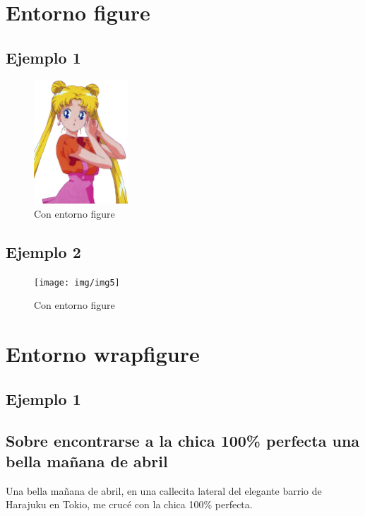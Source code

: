 \documentclass[letterpaper]{article}
\begin{document}
	\newpage
	\section{Entorno figure}
	\subsection{Ejemplo 1}
	
	\begin{figure}[h]
		\centering
		\caption{Con entorno figure}
		\includegraphics[width=100pt]{img/img3_2}
	\end{figure}
	
	\subsection{Ejemplo 2}	
	\begin{figure}[h]
		\centering
		\texttt{[image: img/img5]}
		\caption{Con entorno figure}
	\end{figure}
	
	\newpage
	\section{Entorno wrapfigure}
	
	\subsection{Ejemplo 1}
	\subsection*{Sobre encontrarse a la chica 100\% perfecta una bella mañana de abril}
	
	Una bella mañana de abril, en una callecita lateral del elegante barrio de Harajuku en Tokio, me crucé con la chica 100\% perfecta. \\
	
\end{document}

